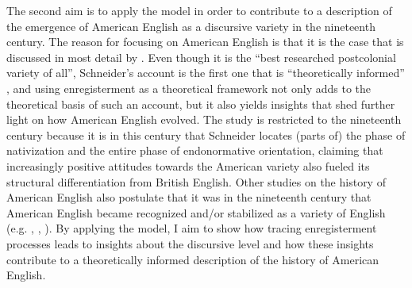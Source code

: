 The second aim is to apply the model in order to contribute to a description of the emergence of American English as a discursive variety in the nineteenth century. The reason for focusing on American English is that it is the case that is discussed in most detail by \citet{Schneider2007}. Even though it is the “best researched postcolonial variety of all”, Schneider’s account is the first one that is “theoretically informed” \citep[250]{Schneider2007}, and using enregisterment as a theoretical framework not only adds to the theoretical basis of such an account, but it also yields insights that shed further light on how American English evolved. The study is restricted to the nineteenth century because it is in this century that Schneider locates (parts of) the phase of nativization and the entire phase of endonormative orientation, claiming that increasingly positive attitudes towards the American variety also fueled its structural differentiation from British English. Other studies on the history of American English also postulate that it was in the nineteenth century that American English became recognized and/or stabilized as a variety of English (e.g. \citealt{Algeo2001a}, \citealt{Bailey2017}, \citealt{Simpson1986}). By applying the model, I aim to show how tracing enregisterment processes leads to insights about the discursive level and how these insights contribute to a theoretically informed description of the history of American English.


